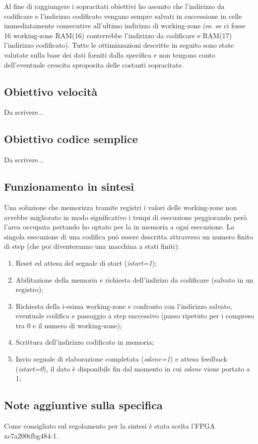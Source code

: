 \documentclass{article}
\begin{document}
Al fine di raggiungere i sopracitati obiettivi ho assunto che l'indirizzo da codificare e l'indirizzo codificato vengano sempre salvati in successione in celle immediatamente consecutive all'ultimo indirizzo di working-zone (es. se ci fosse 16 working-zone RAM(16) conterrebbe l'indirizzo da codificare e RAM(17) l'indirizzo codificato).
Tutte le ottimizzazioni descritte in seguito sono state valutate sulla base dei dati forniti dalla specifica e non tengono conto dell'eventuale crescita sproposita delle costanti sopracitate.
\subsection{Obiettivo velocità}
Da scrivere...
\subsection{Obiettivo codice semplice}
Da scrivere...
\subsection{Funzionamento in sintesi}
Una soluzione che memorizza tramite registri i valori delle working-zone non avrebbe migliorato in modo significativo i tempi di esecuzione peggiorando però l'area occupata pertando ho optato per la  in memoria a ogni esecuzione.
La singola esecuzione di una codifica può essere descritta attraverso un numero finito di step (che poi diventeranno una macchina a stati finiti):
\begin{enumerate}
	\item Reset ed attesa del segnale di start (\textit{i\textunderscore start=1});
	\item Abilitazione della memoria e richiesta dell'indirizo da codificare (salvato in un registro);
	\item Richiesta della i-esima working-zone e confronto con l'indirizzo salvato, eventuale codifica e passaggio a step successivo (passo ripetuto per i compreso tra 0 e il numero di working-zone);
	\item Scrittura dell'indirizzo codificato in memoria;
	\item Invio segnale di elaborazione completata (\textit{o\textunderscore done=1}) e attesa feedback (\textit{i\textunderscore start=0}), il dato è disponibile fin dal momento in cui \textit{o\textunderscore done} viene portato a 1;
\end{enumerate}
\subsection{Note aggiuntive sulla specifica}
Come consigliato sul regolamento per la sintesi è stata scelta l'FPGA xc7a200tfbg484-1.
\end{document}
